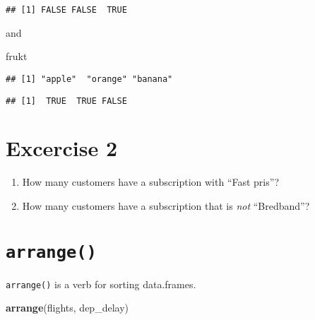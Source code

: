 \documentclass[]{book}
\newenvironment{Shaded}{\begin{snugshade}}{\end{snugshade}}
\newcommand{\KeywordTok}[1]{\textcolor[rgb]{0.13,0.29,0.53}{\textbf{#1}}}
\newcommand{\NormalTok}[1]{#1}
\newcommand{\StringTok}[1]{\textcolor[rgb]{0.31,0.60,0.02}{#1}}
\providecommand{\tightlist}{%
  \setlength{\itemsep}{0pt}\setlength{\parskip}{0pt}}
\begin{document}
\begin{verbatim}
## [1] FALSE FALSE  TRUE
\end{verbatim}

and

\begin{Shaded}
\begin{Highlighting}[]
\NormalTok{frukt}
\end{Highlighting}
\end{Shaded}

\begin{verbatim}
## [1] "apple"  "orange" "banana"
\end{verbatim}

\begin{Shaded}
\end{Shaded}

\begin{verbatim}
## [1]  TRUE  TRUE FALSE
\end{verbatim}

\hypertarget{excercise-2}{%
\section{Excercise 2}\label{excercise-2}}

\begin{enumerate}
\def\labelenumi{\arabic{enumi}.}
\tightlist
\item
  How many customers have a subscription with ``Fast pris''?
\item
  How many customers have a subscription that is \emph{not} ``Bredband''?
\end{enumerate}

\hypertarget{arrange}{%
\section{\texorpdfstring{\texttt{arrange()}}{arrange()}}\label{arrange}}

\texttt{arrange()} is a verb for sorting data.frames.

\begin{Shaded}
\begin{Highlighting}[]
\KeywordTok{arrange}\NormalTok{(flights, dep_delay)}
\end{Highlighting}
\end{Shaded}
\end{document}
